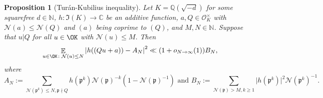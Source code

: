 \documentclass[11pt]{amsart}
\newtheorem{proposition}[lemma]{Proposition}
\theoremstyle{definition}
\DeclareMathOperator*{\E}{\mathbb{E}}
\newcommand{\C}{{\mathbb C}}
\newcommand{\N}{{\mathbb N}}
\newcommand{\NN}{{\mathcal N}}
\newcommand{\Q}{{\mathbb Q}}
\newcommand{\mf}{\mathfrak}
\begin{document}
\begin{proposition}[Tur\'an-Kubilius inequality]\label{TK}
    Let $K=\Q(\sqrt{-d})$ for some squarefree $d\in\N$, $h\colon\mf I(K)\to\C$ be an additive function, $a,Q\in\mathcal{O}_K^{\times}$ with $\NN(a)\leq \NN(Q)$ and $(a)$ being coprime to $(Q)$, and $M,N\in\N$. Suppose that $u\vert Q$ for all $u\in\OK$ with $\NN(u)\leq M$.
    Then \begin{equation}\label{ltk}
    \begin{split}
       \E_{u\in\OK\colon\NN(u) \leq N}\left| h((Qu+a))-A_{N}\right|^{2}
       \ll (1+o_{N\to\infty}(1)) B_{N},
    \end{split}
\end{equation}
where
$$A_{N}:=\sum_{\NN(\mf p^{k})\leq N,\mf p\nmid Q}h(\mf p^{k})\NN(\mf p)^{-k}(1-\NN(\mf p)^{-1}) \text{ and } B_{N}:=\sum_{\NN(\mf p)>M, k\geq 1}\vert h(\mf p^{k})\vert^{2}\NN(\mf p^{k})^{-1}.$$
\end{proposition}
\end{document}
